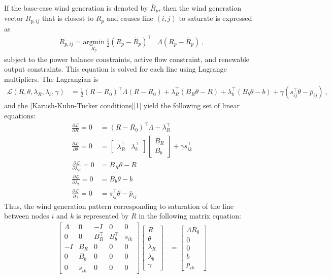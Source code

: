 If the base-case wind generation is denoted by $\bar{R}_p$, then the wind generation vector $R_{p,ij}$ that is closest to $\bar{R}_p$ and causes line $(i,j)$ to saturate is expressed as
$$\begin{align}
R_{p,ij} = \underset{R_p}{\text{argmin}}~\frac{1}{2}(R_p-\bar{R}_p)^\top & \Lambda(R_p-\bar{R}_p)~, 
\end{align}$$
subject to the power balance constraints, active flow constraint, and renewable output constraints. This equation is solved for each line using Lagrange multipliers. The Lagrangian is
$$\begin{align}
\mathcal{L} \left(R ,\theta ,{\lambda }_{R },{\lambda }_{b},\gamma \right) &= \frac{1}{2}{\left(R -{R }_{0}\right)}^{\top }\Lambda \left(R -{R }_{0}\right)+{\lambda }_{R }^{\top }\left({B}_{R }\theta - R\right) + \lambda_b^\top (B_b\theta - b) + \gamma(s_{ij}^\top \theta - \bar{p}_{ij})~,
\end{align}$$
and the [Karush-Kuhn-Tucker conditions][1] yield the following set of linear equations:
$$\begin{align}
\frac{\partial \mathcal{L}}{\partial R} = 0 &= (R - R_0)^\top \Lambda - \lambda_R^\top \\
\frac{\partial \mathcal{L}}{\partial \theta} = 0 &= \begin{bmatrix}
\lambda_R^\top & \lambda_b^\top
\end{bmatrix} \begin{bmatrix}
B_R \\
B_b
\end{bmatrix} + \gamma s_{ik}^\top \\
\frac{\partial \mathcal{L}}{\partial \lambda_R} = 0 &= B_R \theta - R \\
\frac{\partial \mathcal{L}}{\partial \lambda_b} = 0 &= B_b\theta - b \\
\frac{\partial \mathcal{L}}{\partial \gamma} = 0 &= s_{ij}^\top \theta - \bar{p}_{ij}
\end{align}$$
Thus, the wind generation pattern corresponding to saturation of the line between nodes $i$ and $k$ is represented by $R$ in the following matrix equation:
$$\begin{align}
\begin{bmatrix}
\Lambda & 0 & -I & 0 & 0 \\
0 & 0 & B_R^\top & B_b^\top & s_{ik} \\
-I & B_R & 0 & 0 & 0 \\
0 & B_b & 0 & 0 & 0 \\
0 & s_{ik}^\top & 0 & 0 & 0
\end{bmatrix} \begin{bmatrix}
R \\
\theta \\
\lambda_R \\
\lambda_b \\
\gamma
\end{bmatrix} &= \begin{bmatrix}
\Lambda R_0 \\
0 \\
0 \\
b \\
\bar{p}_{ik}
\end{bmatrix}
\end{align}$$

